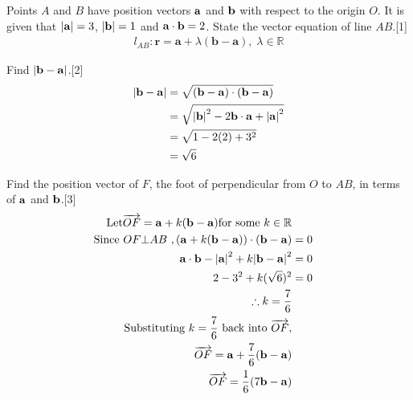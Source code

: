 \documentclass[12pt, a4 paper]{article}
\begin{document}
\begin{outline}[enumerate]
	\color{black}
	\1 Points $A$ and $B$ have position vectors $\bf{a}$ and $\bf{b}$ with respect to the origin $O$. It is given that $\left| {\bf{a}} \right| = 3$, $\left| {\bf{b}} \right| = 1$ and ${\bf{a}} \cdot {\bf{b}} = 2$.
	\2 State the vector equation of line $AB$.\hfill[1]
	\color{blue}
	\begin{align*}
		l_{AB}:{\mathbf{r}} = {\mathbf{a}} + \lambda ({\mathbf{b}} - {\mathbf{a}}),\;\lambda  \in \mathbb{R} 
	\end{align*}
	\color{black}
							        
	\2 Find $\left| {{\bf{b}} - {\bf{a}}} \right|$.\hfill[2]
	\color{blue}
	\begin{align*}
		\left| {{\bf{b}} - {\bf{a}}} \right| & = \sqrt {({\bf{b}} - {\bf{a}}) \cdot ({\bf{b}} - {\bf{a}})} \\ &= \sqrt {{{\left| {\bf{b}} \right|}^2} - 2{\bf{b}} \cdot {\bf{a}} + {{\left| {\bf{a}} \right|}^2}} \\ &= \sqrt {1 - 2(2) + {3^2}} \\ &= \sqrt 6
	\end{align*}
	\color{black}
							        
	\2 Find the position vector of $F$, the foot of perpendicular from $O$ to $AB$, in terms of $\bf{a}$ and $\bf{b}$.\hfill[3]
	\color{blue}
	\begin{align*}
		\textrm{Let}\overrightarrow {OF}  = {\bf{a}} + k({\bf{b}} - {\bf{a}})\textrm{for some }k \in \mathbb{R}\\
		{\textrm{Since }}OF \bot AB  {\textrm{ }},({\bf{a}} + k({\bf{b}} - {\bf{a}})) \cdot ({\bf{b}} - {\bf{a}}) & = 0 \\{\bf{a}} \cdot {\bf{b}} - {\left| {\bf{a}} \right|^2} + k{\left| {{\bf{b}} - {\bf{a}}} \right|^2} &= 0\\2 - {3^2} + k{(\sqrt 6 )^2} &= 0\\\therefore k = \dfrac{7}{6}\\\textrm{Substituting }k = \dfrac{7}{6}\textrm{ back into }\overrightarrow {OF} ,\\\overrightarrow {OF}  = {\bf{a}} + \dfrac{7}{6}({\bf{b}} - {\bf{a}})\\\overrightarrow {OF}  = \dfrac{1}{6}(7{\bf{b}} - {\bf{a}})
	\end{align*}
	\color{black}
							    

\end{outline}
\end{document}
